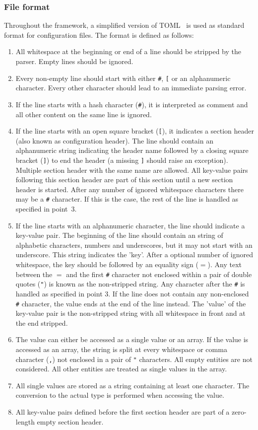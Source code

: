 \subsubsection{File format}
\label{sec:config_file_format}
Throughout the framework, a simplified version of TOML~\cite{tomlgit} is used as standard format for configuration files.
The format is defined as follows:
\begin{enumerate}
\item All whitespace at the beginning or end of a line should be stripped by the parser.
Empty lines should be ignored.
\item Every non-empty line should start with either \texttt{\#}, \texttt{[} or an alphanumeric character.
Every other character should lead to an immediate parsing error.
\item If the line starts with a hash character (\texttt{\#}), it is interpreted as comment and all other content on the same line is ignored.
\item If the line starts with an open square bracket (\texttt{[}), it indicates a section header (also known as configuration header).
The line should contain an alphanumeric string indicating the header name followed by a closing square bracket (\texttt{]}) to end the header (a missing \texttt{]} should raise an exception).
Multiple section header with the same name are allowed.
All key-value pairs following this section header are part of this section until a new section header is started.
After any number of ignored whitespace characters there may be a \texttt{\#} character.
If this is the case, the rest of the line is handled as specified in point~3.
\item If the line starts with an alphanumeric character, the line should indicate a key-value pair.
The beginning of the line should contain an string of alphabetic characters, numbers and underscores, but it may not start with an underscore.
This string indicates the 'key'.
After a optional number of ignored whitespace, the key should be followed by an equality sign (\texttt{$=$}).
Any text between the \texttt{$=$} and the first \texttt{\#} character not enclosed within a pair of double quotes (\texttt{"}) is known as the non-stripped string.
Any character after the \texttt{\#} is handled as specified in point 3.
If the line does not contain any non-enclosed \texttt{\#} character, the value ends at the end of the line instead.
The 'value' of the key-value pair is the non-stripped string with all whitespace in front and at the end stripped.
\item The value can either be accessed as a single value or an array.
If the value is accessed as an array, the string is split at every whitespace or comma character (\texttt{,}) not enclosed in a pair of \texttt{"} characters.
All empty entities are not considered.
All other entities are treated as single values in the array.
\item All single values are stored as a string containing at least one character.
The conversion to the actual type is performed when accessing the value.
\item All key-value pairs defined before the first section header are part of a zero-length empty section header.
\end{enumerate}


